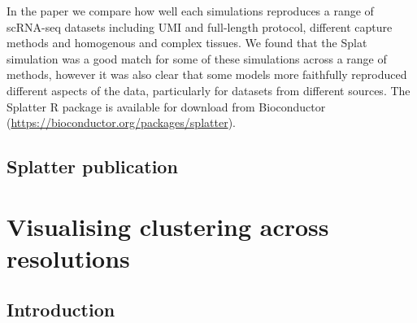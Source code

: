 \documentclass[11pt,a4paper,titlepage,twoside,openright]{style/unimelbthesis}
\theoremstyle{definition}
\theoremstyle{definition}
\theoremstyle{definition}
\theoremstyle{remark}
\begin{document}
\begin{mainmatter}
In the paper we compare how well each simulations reproduces a range of scRNA-seq datasets including UMI and full-length protocol, different capture methods and homogenous and complex tissues. We found that the Splat simulation was a good match for some of these simulations across a range of methods, however it was also clear that some models more faithfully reproduced different aspects of the data, particularly for datasets from different sources. The Splatter R package is available for download from Bioconductor (\url{https://bioconductor.org/packages/splatter}).

\hypertarget{splatter-publication}{%
\section{Splatter publication}\label{splatter-publication}}


\hypertarget{visualising-clustering-across-resolutions}{%
\chapter{Visualising clustering across resolutions}\label{visualising-clustering-across-resolutions}}

\hypertarget{introduction-3}{%
\section{Introduction}\label{introduction-3}}


\end{mainmatter}
\end{document}
